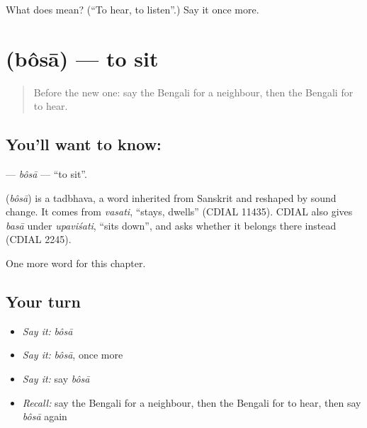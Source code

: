 \begin{tcolorbox}[breakable,colback=teal!4,colframe=teal!35!black,title={Before you move on}]
What does  mean? (\textquotedblleft{}To hear, to listen\textquotedblright{}.) Say it once more.
\end{tcolorbox}
\section[\texorpdfstring{\bn{বসা} (bôsā)}{বসা (bôsā)}]{ (bôsā) — to sit}

\label{lesson:BN-C48-bosa}



\begin{quote}
Before the new one: say the Bengali for a neighbour, then the Bengali for to hear.
\end{quote}

\subsection*{You'll want to know: }
\textbf{} — \emph{bôsā} — \textquotedblleft{}to sit\textquotedblright{}.

\begin{cousinweb}
\textbf{} (\emph{bôsā}) is a tadbhava, a word inherited from Sanskrit and reshaped by sound change. It comes from \emph{vasati}, \textquotedblleft{}stays, dwells\textquotedblright{} (CDIAL 11435). CDIAL also gives \emph{basā} under \emph{upaviśati}, \textquotedblleft{}sits down\textquotedblright{}, and asks whether it belongs there instead (CDIAL 2245).
\end{cousinweb}

\begin{grammarlens}[title={What you've built}]
One more word for this chapter.
\end{grammarlens}

\subsection*{Your turn}
\begin{itemize}
\raggedright
  \item \emph{Say it:} \emph{bôsā}
  \item \emph{Say it:} \emph{bôsā}, once more
  \item \emph{Say it:} say \emph{bôsā}
  \item \emph{Recall:} say the Bengali for a neighbour, then the Bengali for to hear, then say \emph{bôsā} again
\end{itemize}

